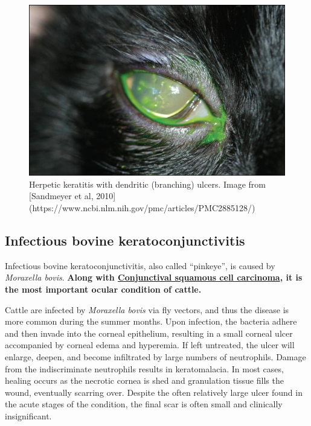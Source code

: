 \documentclass[
  openany]{article}
\begin{document}
\begin{figure}

{\centering \includegraphics{images/dendritic_ulcer_feline} 

}

\caption{Herpetic keratitis with dendritic (branching) ulcers. Image from [Sandmeyer et al, 2010](https://www.ncbi.nlm.nih.gov/pmc/articles/PMC2885128/)}\label{fig:dendritic}
\end{figure}

\hypertarget{infectious-bovine-keratoconjunctivitis}{%
\subsection{Infectious bovine keratoconjunctivitis}\label{infectious-bovine-keratoconjunctivitis}}

Infectious bovine keratoconjunctivitis, also called ``pinkeye'', is caused by \emph{Moraxella bovis}. \textbf{Along with \protect\hyperlink{conjunctival-squamous-cell-carcinoma}{Conjunctival squamous cell carcinoma}, it is the most important ocular condition of cattle.}

Cattle are infected by \emph{Moraxella bovis} via fly vectors, and thus the disease is more common during the summer months. Upon infection, the bacteria adhere and then invade into the corneal epithelium, resulting in a small corneal ulcer accompanied by corneal edema and hyperemia. If left untreated, the ulcer will enlarge, deepen, and become infiltrated by large numbers of neutrophils. Damage from the indiscriminate neutrophils results in keratomalacia. In most cases, healing occurs as the necrotic cornea is shed and granulation tissue fills the wound, eventually scarring over. Despite the often relatively large ulcer found in the acute stages of the condition, the final scar is often small and clinically insignificant.
\end{document}
